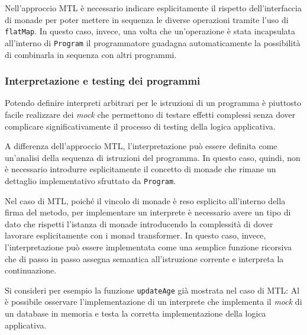 Nell'approccio MTL è necessario indicare esplicitamente il rispetto dell'interfaccia di monade per poter mettere in sequenza le diverse operazioni tramite l'uso di \lstinline{flatMap}. In questo caso, invece, una volta che un'operazione è stata incapsulata all'interno di \lstinline{Program} il programmatore guadagna automaticamente la possibilità di combinarla in sequenza con altri programmi.

\subsubsection{Interpretazione e testing dei programmi}
Potendo definire interpreti arbitrari per le istruzioni di un programma è piuttosto facile realizzare dei \emph{mock} che permettono di testare effetti complessi senza dover complicare significativamente il processo di testing della logica applicativa.

A differenza dell'approccio MTL, l'interpretazione può essere definita come un'analisi della sequenza di istruzioni del programma.
In questo caso, quindi, non è necessario introdurre esplicitamente il concetto di monade che rimane un dettaglio implementativo sfruttato da \lstinline{Program}.

Nel caso di MTL, poiché il vincolo di monade è reso esplicito all'interno della firma del metodo, per implementare un interprete è necessario avere un tipo di dato che rispetti l'istanza di monade introducendo la complessità di dover lavorare esplicitamente con i monad transformer.
In questo caso, invece, l'interpretazione può essere implementata come una semplice funzione ricorsiva che di passo in passo assegna semantica all'istruzione corrente e interpreta la continuazione.

Si consideri per esempio la funzione \lstinline{updateAge} già mostrata nel caso di MTL:
Al  è possibile osservare l'implementazione di un interprete che implementa il \emph{mock} di un database in memoria e testa la corretta implementazione della logica applicativa.

